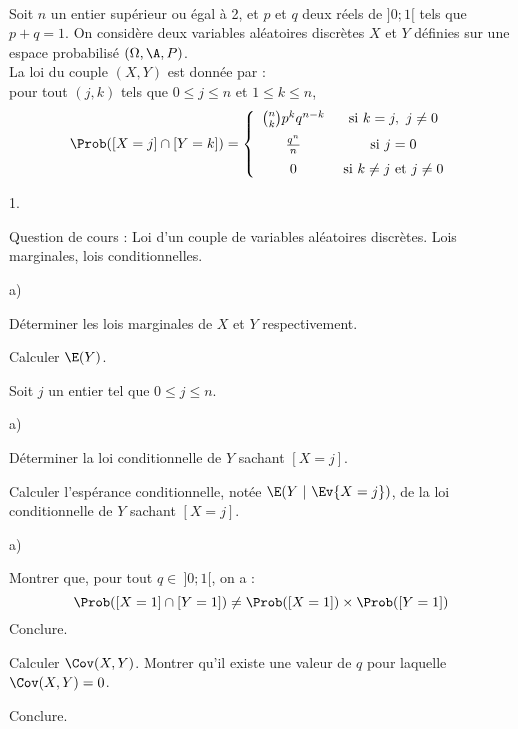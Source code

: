 \documentclass[11pt]{article}%
\begin{document}
\begin{exerciceAP}~\\
  Soit $n$ un entier supérieur ou égal à 2, et $p$ et $q$ deux réels
  de $]0;1[$ tels que $p+q=1$. On considère deux variables aléatoires
  discrètes $X$ et $Y$ définies sur une espace probabilisé $(\Omega ,
  \A , P)$.\\
  La loi du couple $(X , Y)$ est donnée par : \\
  pour tout $(j,k)$ tels que $0 \leq j \leq n$ et $1 \leq k \leq n$,
  \[
  \Prob( [X=j] \cap [Y=k] ) = \left\{ 
    \begin{array}{cc} 
      \binom{n}{k} p^k q^{n-k} & \text{ si } k=j,\ j \neq 0 \\[.2cm] 
      \frac{q^n}{n} & \text{ si } j=0 \\[.2cm] 
      0 & \text{ si } k \neq j \text{ et } j \neq 0 
    \end{array} 
  \right.
  \]
  \begin{noliste}{1.}
    \setlength{\itemsep}{2mm}
  \item Question de cours : Loi d'un couple de variables aléatoires
    discrètes. Lois marginales, lois conditionnelles.
  \item 
    \begin{noliste}{a)}
    \setlength{\itemsep}{2mm} \item Déterminer les lois marginales de $X$ et
      $Y$ respectivement.
    \item Calculer $\E(Y)$.
    \end{noliste}
  \item Soit $j$ un entier tel que $0 \leq j \leq n$.
    \begin{noliste}{a)}
    \setlength{\itemsep}{2mm} \item Déterminer la loi conditionnelle de $Y$
      sachant $[X=j]$.
    \item Calculer l'espérance conditionnelle, notée $\E(Y \ | \ \Ev{X
        = j})$, de la loi conditionnelle de $Y$ sachant $ [X=j]$.
    \end{noliste}
  \item
    \begin{noliste}{a)}
      \setlength{\itemsep}{2mm} 
    \item Montrer que, pour tout $q \in \ ] 0 ; 1[$, on a :
      \[
      \Prob( [X=1] \cap [Y=1]) \neq \Prob([X=1]) \times \Prob( [Y=1] )
      \]
      Conclure.
    \item Calculer $\Cov (X,Y)$. Montrer qu'il existe une valeur de
      $q$ pour laquelle $\Cov (X,Y) = 0$.
    \item Conclure.
    \end{noliste} 
  \end{noliste}
\end{exerciceAP}
\end{document}
